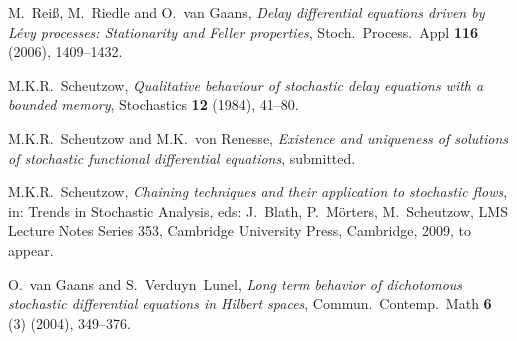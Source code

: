 \documentclass[11pt,reqno,draft]{amsart}
\begin{document}
\begin{thebibliography}{99}
 M.\ Rei\ss, M.\ Riedle and O.\ van Gaans, {\it Delay differential equations driven by L\'evy processes: Stationarity and Feller properties}, Stoch.\ Process.\ Appl \textbf{116} (2006), 1409--1432.

 M.K.R.\ Scheutzow, {\it Qualitative behaviour of stochastic delay equations with a bounded memory}, Stochastics \textbf{12} (1984), 41--80.

 M.K.R.\ Scheutzow and M.K.\ von Renesse, {\it Existence and uniqueness of solutions of stochastic functional differential equations}, submitted.

 M.K.R.\ Scheutzow, {\it Chaining techniques and their application to stochastic flows}, in: Trends in {S}tochastic {A}nalysis,
eds: J.\ Blath, P.\ M\"orters, M.\ Scheutzow,
LMS Lecture Notes Series 353, Cambridge University Press, Cambridge, 2009, to appear.

 O.\ van Gaans and S.\ Verduyn\ Lunel, {\it Long term behavior of dichotomous stochastic differential equations in Hilbert spaces}, Commun.\ Contemp.\ Math \textbf{6} (3) (2004), 349--376.

\end{thebibliography}
\end{document}

